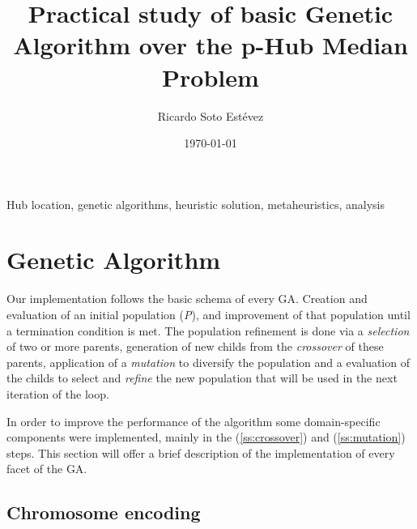 \documentclass[onecolumn]{IEEEtran}
\author{Ricardo Soto Estévez}
\affil{Menendez Pelayo International University}
\date{\today}
\title{Practical study of basic Genetic Algorithm over the p-Hub Median Problem}
\begin{document}
\maketitle

\begin{abstract}  \end{abstract}

\begin{IEEEkeywords}
Hub location, genetic algorithms, heuristic solution, metaheuristics, analysis 
\end{IEEEkeywords}




\section{Genetic Algorithm}

Our implementation follows the basic schema of every GA\cite{Thede2004}. Creation and evaluation of an initial
population (\emph{P}), and improvement of that population until a termination condition is met. The population
refinement  is done via a \emph{selection} of two or more parents, generation of new childs from the
\emph{crossover} of these parents, application of a \emph{mutation} to diversify the population and a
evaluation of the childs to select and \emph{refine} the new population that will be used in the next
iteration of the loop.


In order to improve the performance of the algorithm some domain-specific components were implemented,
mainly in the  (\ref{ss:crossover}) 
and  (\ref{ss:mutation}) steps. This 
section will offer a brief description of the implementation of every facet of the GA.

\subsection{Chromosome encoding\label{ss:chromosome}}
\end{document}
